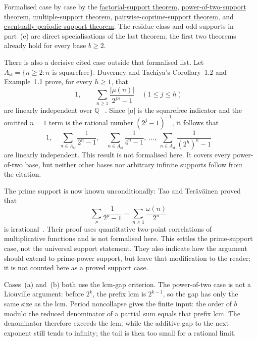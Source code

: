 \documentclass[11pt]{article}
\newcommand{\commit}{bb4e24651b37cd096d3749ef299c3317930b3a3b}
\newcommand{\repobase}{https://github.com/wcook04/plectis-lean-erdos249-257/blob/\commit}
\newcommand{\PK}{Erdos249257}
\newcommand{\lword}[4]{\href{\repobase/\PK/#1\#L#2}{#4}}
\theoremstyle{definition}
\theoremstyle{remark}
\newcommand{\Q}{\mathbb{Q}}
\begin{document}
\noindent Formalised case by case by the
\lword{CertificateKernel.lean}{6035}{irrational_erdosSum_factorial_support}{factorial-support theorem},
\lword{CertificateKernel.lean}{6059}{irrational_erdosSum_two_pow_support}{power-of-two-support theorem},
\lword{CertificateKernel.lean}{9103}{irrational_erdosSupportSeries_multiples}{multiple-support theorem},
\lword{CertificateKernel.lean}{10776}{irrational_erdosSupportSeries_pairwise_coprime}{pairwise-coprime-support theorem},
and
\lword{CertificateKernel.lean}{11604}{irrational_erdosSupportSeries_eventuallyPeriodic}{eventually-periodic-support theorem}.
The residue-class and odd supports in part~\textup{(e)} are direct
specialisations of the last theorem; the first two theorems already hold for
every base \(b\geq2\).

There is also a decisive cited case outside that formalised list.  Let
\(A_{\mathrm{sf}}=\{n\ge2:n\text{ is squarefree}\}\).  Duverney and Tachiya's
Corollary~1.2 and Example~1.1 prove, for every \(h\ge1\), that
\[
  1,\qquad
  \sum_{n\ge1}\frac{|\mu(n)|}{2^{jn}-1}\quad(1\le j\le h)
\]
are linearly independent over \(\Q\)
~\cite[Cor.~1.2 and Ex.~1.1, author-preprint p.~4]{duverneytachiya}.  Since
\(|\mu|\) is the squarefree indicator and the omitted \(n=1\) term is the
rational number \((2^j-1)^{-1}\), it follows that
\[
  1,\quad
  \sum_{n\in A_{\mathrm{sf}}}\frac1{2^n-1},\quad
  \sum_{n\in A_{\mathrm{sf}}}\frac1{4^n-1},\ \ldots,\
  \sum_{n\in A_{\mathrm{sf}}}\frac1{(2^h)^n-1}
\]
are linearly independent.  This result is not formalised here.  It covers
every power-of-two base, but neither other bases nor arbitrary infinite
supports follow from the citation.

The prime support is now known unconditionally: Tao and Ter\"av\"ainen proved
that
\[
  \sum_p\frac1{2^p-1}=\sum_{n\ge1}\frac{\omega(n)}{2^n}
\]
is irrational~\cite[Theorem~1.3, p.~4; proof in Section~5,
pp.~44--56]{taoteravainen}. Their proof uses quantitative two-point
correlations of multiplicative functions and is not formalised here. This
settles the prime-support case, not the universal support statement.
They also indicate how the argument should extend to
prime-power support, but leave that modification to the reader; it is not
counted here as a proved support case.

Cases~\textup{(a)} and~\textup{(b)} both use the lcm-gap criterion.  The
power-of-two case is not a Liouville argument: before \(2^k\), the prefix lcm is
\(2^{k-1}\), so the gap has only the same size as the lcm.  Period noncollapse
gives the finite input: the order of \(b\) modulo the reduced denominator of a
partial sum equals that prefix lcm.  The denominator therefore exceeds the lcm,
while the additive gap to the next exponent still tends to infinity; the tail
is then too small for a rational limit.
\end{document}

